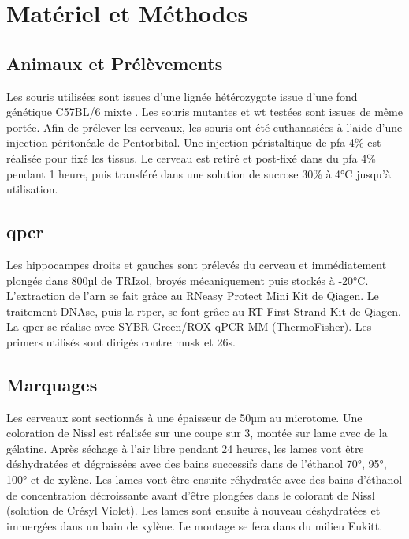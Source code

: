\chapter{Matériel et Méthodes}

\section{Animaux et Prélèvements}
\label{sec:AnimEtPrelev}
	Les souris utilisées sont issues d'une lignée hétérozygote issue d'une fond génétique C57BL/6 mixte \cite{Messeant2015, Messeant2017}. Les souris mutantes \mcrd et \gls{wt} testées sont issues de même portée. 
	Afin de prélever les cerveaux, les souris ont été euthanasiées à l'aide d'une injection péritonéale de Pentorbital. Une injection péristaltique de \gls{pfa} 4\% est réalisée pour fixé les tissus. Le cerveau est retiré et post-fixé dans du \gls{pfa} 4\% pendant 1 heure, puis transféré dans une solution de sucrose 30\% à 4°C jusqu'à utilisation.
	
\section{\acrshort{qpcr}}
\label{sec:qPCR}
	Les hippocampes droits et gauches sont prélevés du cerveau et immédiatement plongés dans 800µl de TRIzol\textregistered, broyés mécaniquement puis stockés à -20°C. L'extraction de l'\gls{arn} se fait grâce au RNeasy Protect Mini Kit de Qiagen\textregistered. Le traitement DNAse, puis la \gls{rtpcr}, se font grâce au RT First Strand Kit de Qiagen\textregistered. La \gls{qpcr} se réalise avec SYBR Green/ROX qPCR MM (ThermoFisher\textregistered). Les primers utilisés sont dirigés contre \gls{musk} et \acrshort{26s}.
	
\section{Marquages}
\label{sec:Marquages}
	Les cerveaux sont sectionnés à une épaisseur de 50µm au microtome. Une coloration de Nissl est réalisée sur une coupe sur 3, montée sur lame avec de la gélatine. Après séchage à l'air libre pendant 24 heures, les lames vont être déshydratées et dégraissées avec des bains successifs dans de l'éthanol 70°, 95°, 100° et de xylène. Les lames vont être ensuite réhydratée avec des bains d'éthanol de concentration décroissante avant d'être plongées dans le colorant de Nissl (solution de Crésyl Violet).  Les lames sont ensuite  à nouveau déshydratées et immergées dans un bain de xylène. Le montage se fera dans du milieu Eukitt\textregistered.
	

